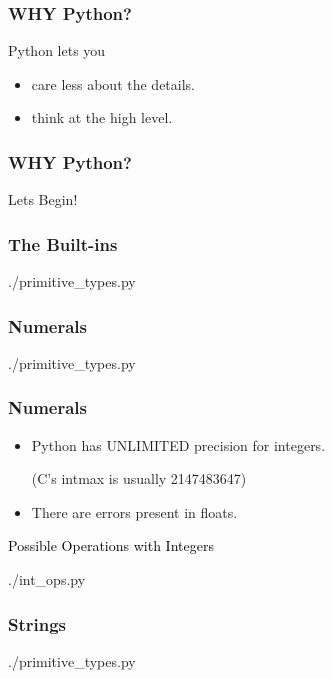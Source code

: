 \documentclass{beamer}
\begin{document}
\begin{frame}
\frametitle{WHY Python?}
  {\Large{Python lets you}}
  \begin{itemize}
    \item care less about the details.
    \item think at the high level.
  \end{itemize}
\end{frame}

\begin{frame}
\frametitle{WHY Python?}
  \begin{center}
  {\Large{Lets Begin!}}
  \end{center}

\end{frame}

\begin{frame}
  \frametitle{The Built-ins}
    \begin{lstinputlisting}
      {./primitive_types.py}
    \end{lstinputlisting}
\end{frame}

\begin{frame}
  \frametitle{Numerals}
    \begin{lstinputlisting}[firstline=1, lastline=6]
      {./primitive_types.py}
    \end{lstinputlisting}
\end{frame}

\begin{frame}
  \frametitle{Numerals}
  \begin{itemize}
    \item Python has \alert{UNLIMITED} precision for integers.

      (C's intmax is usually 2147483647)
    \item There are errors present in floats.
  \end{itemize}

\end{frame}

\begin{frame}
  \textcolor{black}{\large{Possible Operations with Integers}}
    \begin{lstinputlisting}
      {./int_ops.py}
    \end{lstinputlisting}
\end{frame}

\begin{frame}
  \frametitle{Strings}
    \begin{lstinputlisting}[firstline=8, lastline=12]
      {./primitive_types.py}
    \end{lstinputlisting}

\end{frame}
\end{document}
